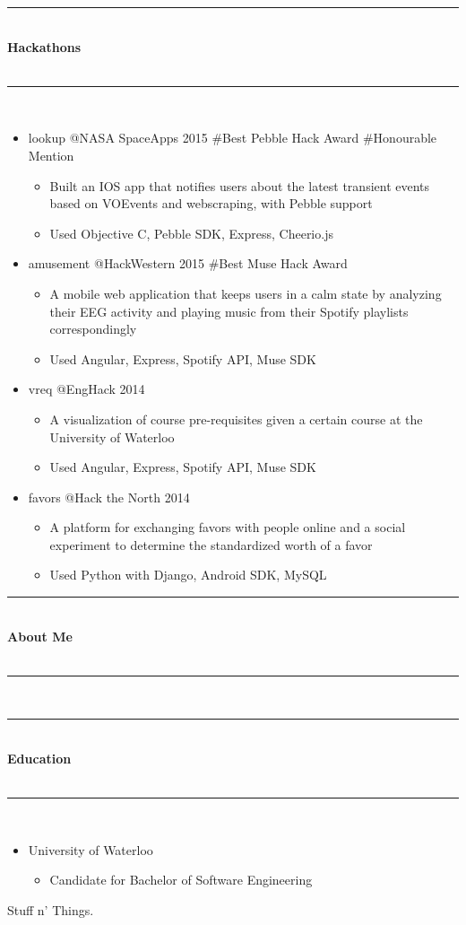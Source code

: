 \documentclass[10pt]{article}
\makeatletter
\newcommand{\cvsectiontitle}[1]{%
	\rule{\linewidth}{0.2mm}\\%
		{\large\indent\textbf{#1}}\\%
	\\[-6.5mm]\rule{\linewidth}{0.2mm}\\[2mm]%
	}
\newcommand{\cvcompany}[2]{{#1}\hspace{\stretch{3}}{(#2)}}
\newcommand{\cvhackathonproject}[2]{{#1} @{#2}}
\newcommand{\cvsublevel}[1]{\begin{itemize}[leftmargin=0.5cm] #1\end{itemize}}
\newcommand{\cvsubbullet}[1]{\vspace{-1mm}\item #1}
\makeatother
\begin{document}
\cvsectiontitle{Hackathons}
\vspace{-0.8cm}
\begin{itemize}[leftmargin=0.5cm]
\item \cvhackathonproject{lookup}{NASA SpaceApps 2015 \#Best Pebble Hack Award \#Honourable Mention}\cvsublevel{
	\cvsubbullet{Built an IOS app that notifies users about the latest transient events based on VOEvents and webscraping, with Pebble support}
	\cvsubbullet{Used Objective C, Pebble SDK, Express, Cheerio.js}
}
\item \cvhackathonproject{amusement}{HackWestern 2015 \#Best Muse Hack Award}\cvsublevel{
	\cvsubbullet{A mobile web application that keeps users in a calm state by analyzing their EEG activity and playing music from their Spotify playlists correspondingly}
	\cvsubbullet{Used Angular, Express, Spotify API, Muse SDK}
}
\item \cvhackathonproject{vreq}{EngHack 2014}\cvsublevel{
	\cvsubbullet{A visualization of course pre-requisites given a certain course at the University of Waterloo}
	\cvsubbullet{Used Angular, Express, Spotify API, Muse SDK}
}
\item \cvhackathonproject{favors}{Hack the North 2014}\cvsublevel{
	\cvsubbullet{A platform for exchanging favors with people online and a social experiment to determine the standardized worth of a favor}
	\cvsubbullet{Used Python with Django, Android SDK, MySQL}
}
\end{itemize}

\cvsectiontitle{About Me}
\cvsectiontitle{Education}
\vspace{-0.8cm}
\begin{itemize}[leftmargin=0.5cm]
\item \cvcompany{University of Waterloo}{September 2013 - May 2018}\cvsublevel{
	\cvsubbullet{Candidate for Bachelor of Software Engineering}
}
\end{itemize}
Stuff n' Things.
\end{document}
